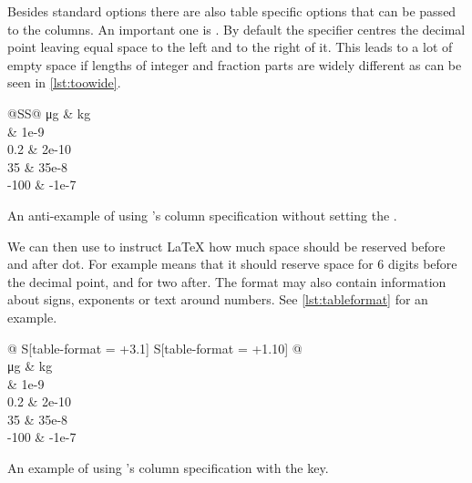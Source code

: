 Besides standard options there are also table specific options that can be
passed to the columns. An important one is . By default the
 specifier centres the decimal point leaving equal space to the left
and to the right of it. This leads to a lot of empty space if lengths of
integer and fraction parts are widely different as can be seen in
\autoref{lst:toowide}.
\begin{listing}
  \begin{example}[examplewidth=0.7\linewidth, vertical_mode]
\begin{tabular} {@{}SS@{}}
  \toprule
  {\unit{\ug}} & {\unit{\kg}} \\
   & 1e-9 \\
  0.2 & 2e-10 \\
  35 & 35e-8 \\
  -100 & -1e-7 \\
  \bottomrule
\end{tabular}
\end{example}
  \caption{An anti-example of using 's  column
    specification without setting the .}\label{lst:toowide}
\end{listing}
We can then use
 to instruct \LaTeX{} how much space should be reserved
before and after dot. For example  means that it should reserve
space for 6 digits before the decimal point, and for two after. The format may
also contain information about signs, exponents or text around numbers. See
\autoref{lst:tableformat} for an example.
\begin{listing}
  \begin{example}[examplewidth=0.7\linewidth, vertical_mode]
\begin{tabular} {
    @{}
    S[table-format = +3.1]
    S[table-format = +1.10]
    @{}
  }
  \toprule
   \\
  \midrule
  {\unit{\ug}} & {\unit{\kg}} \\
   & 1e-9 \\
  0.2 & 2e-10 \\
  35 & 35e-8 \\
  -100 & -1e-7 \\
  \bottomrule
\end{tabular}
\end{example}
  \caption{An example of using 's  column
    specification with the  key.}\label{lst:tableformat}
\end{listing}

